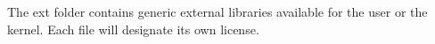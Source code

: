 The ext folder contains generic external libraries available for the user or the kernel. Each file will designate its own license. 